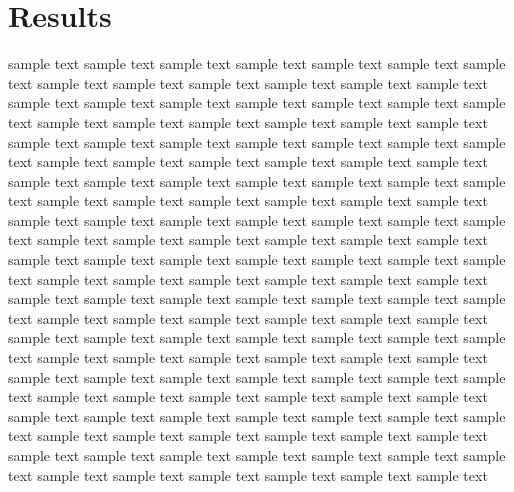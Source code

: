 \section{Results}


sample text sample text sample text sample text sample text sample text sample
text sample text sample text sample text sample text sample text sample text
sample text sample text sample text sample text sample text sample text sample
text sample text sample text sample text sample text sample text sample text
sample text sample text sample text sample text sample text sample text sample
text sample text sample text sample text sample text sample text sample text
sample text sample text sample text sample text sample text sample text sample
text sample text sample text sample text sample text sample text sample text
sample text sample text sample text sample text sample text sample text sample
text sample text sample text sample text sample text sample text sample text
sample text sample text sample text sample text sample text sample text sample
text sample text sample text sample text sample text sample text sample text
sample text sample text sample text sample text sample text sample text sample
text sample text sample text sample text sample text sample text sample text
sample text sample text sample text sample text sample text sample text sample
text sample text sample text sample text sample text sample text sample text
sample text sample text sample text sample text sample text sample text sample
text sample text sample text sample text sample text sample text sample text
sample text sample text sample text sample text sample text sample text sample
text sample text sample text sample text sample text sample text sample text
sample text sample text sample text sample text sample text sample text sample
text sample text sample text sample text sample text sample text sample text

